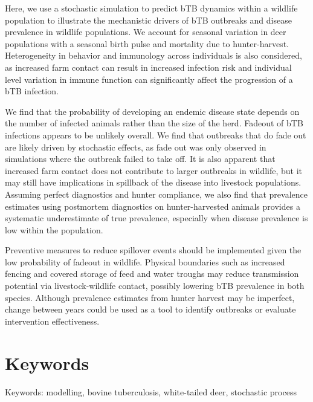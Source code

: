 \documentclass[number,preprint,review,12pt]{elsarticle}
\begin{document}
Here, we use a stochastic simulation to predict bTB dynamics within a wildlife population to illustrate the mechanistic drivers of bTB outbreaks and disease prevalence in wildlife populations. We account for seasonal variation in deer populations with a seasonal birth pulse and mortality due to hunter-harvest. Heterogeneity in behavior and immunology across individuals is also considered, as increased farm contact can result in increased infection risk and individual level variation in immune function can significantly affect the progression of a bTB infection.

We find that the probability of developing an endemic disease state depends on the number of infected animals rather than the size of the herd. Fadeout of bTB infections appears to be unlikely overall. We find that outbreaks that do fade out are likely driven by stochastic effects, as fade out was only observed in simulations where the outbreak failed to take off. It is also apparent that increased farm contact does not contribute to larger outbreaks in wildlife, but it may still have implications in spillback of the disease into livestock populations. Assuming perfect diagnostics and hunter compliance, we also find that prevalence estimates using postmortem diagnostics on hunter-harvested animals provides a systematic underestimate of true prevalence, especially when disease prevalence is low within the population. 

Preventive measures to reduce spillover events should be implemented given the low probability of fadeout in wildlife. Physical boundaries such as increased fencing and covered storage of feed and water troughs may reduce transmission potential via livestock-wildlife contact, possibly lowering bTB prevalence in both species. Although prevalence estimates from hunter harvest may be imperfect, change between years could be used as a tool to identify outbreaks or evaluate intervention effectiveness.

\section{Keywords}
\doublespacing
Keywords: modelling, bovine tuberculosis, white-tailed deer, stochastic process

\pagebreak
\end{document}
